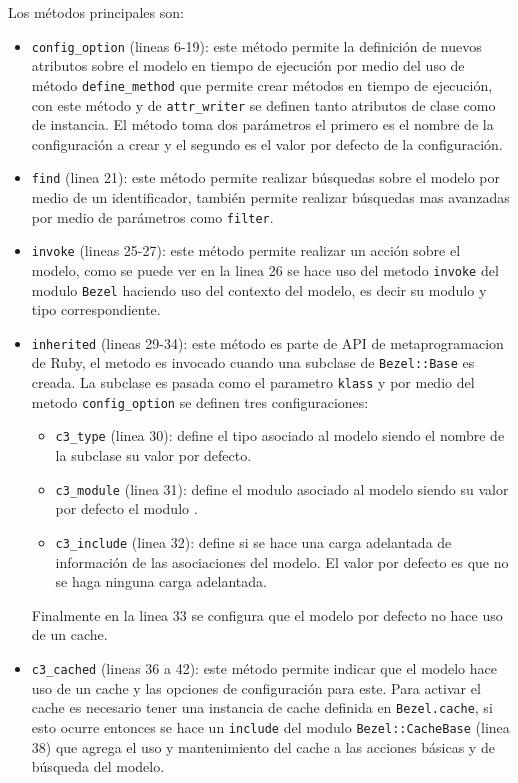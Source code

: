 Los métodos principales son:
\begin{itemize}
  \item \texttt{config\_option} (lineas 6-19): este método permite la definición
    de nuevos atributos sobre el modelo en tiempo de ejecución por medio del uso
    de método \texttt{define\_method} que permite crear métodos en tiempo
    de ejecución, con este método y de \texttt{attr\_writer} se definen tanto
    atributos de clase como de instancia. El método toma dos parámetros
    el primero es el nombre de la configuración a crear y el segundo
    es el valor por defecto de la configuración.
  \item \texttt{find} (linea 21): este método permite realizar búsquedas sobre
    el modelo por medio de un identificador, también permite realizar búsquedas
    mas avanzadas por medio de parámetros como \texttt{filter}.
  \item \texttt{invoke} (lineas 25-27): este método permite realizar
    un acción sobre el modelo, como se puede ver en la linea 26 se hace uso del
    metodo \texttt{invoke} del modulo \texttt{Bezel} haciendo
    uso del contexto del modelo, es decir su modulo y tipo correspondiente.
  \item \texttt{inherited} (lineas 29-34): este método es parte de API de
    metaprogramacion de Ruby, el metodo es invocado cuando una subclase de
    \texttt{Bezel::Base} es creada. La subclase es pasada como el parametro
    \texttt{klass} y por medio del metodo \texttt{config\_option} se definen
    tres configuraciones:
    \begin{itemize}
    \item \texttt{c3\_type} (linea 30): define el tipo asociado al modelo
      siendo el nombre de la subclase su valor por defecto.
    \item \texttt{c3\_module} (linea 31): define el modulo asociado al modelo
      siendo su valor por defecto el modulo .
    \item \texttt{c3\_include} (linea 32): define si se hace una carga adelantada
      de información de las asociaciones del modelo. El valor por defecto es que
      no se haga ninguna carga adelantada.
    \end{itemize}
    Finalmente en la linea 33 se configura que el modelo por defecto no hace uso
    de un cache.
  \item \texttt{c3\_cached} (lineas 36 a 42): este método permite indicar
    que el modelo hace uso de un cache y las opciones de configuración para este.
    Para activar el cache es necesario tener una instancia de cache definida en
    \texttt{Bezel.cache}, si esto ocurre entonces se hace un \texttt{include}
    del modulo \texttt{Bezel::CacheBase} (linea 38) que agrega el uso y
    mantenimiento del cache a las acciones básicas y de búsqueda del modelo.
\end{itemize}

